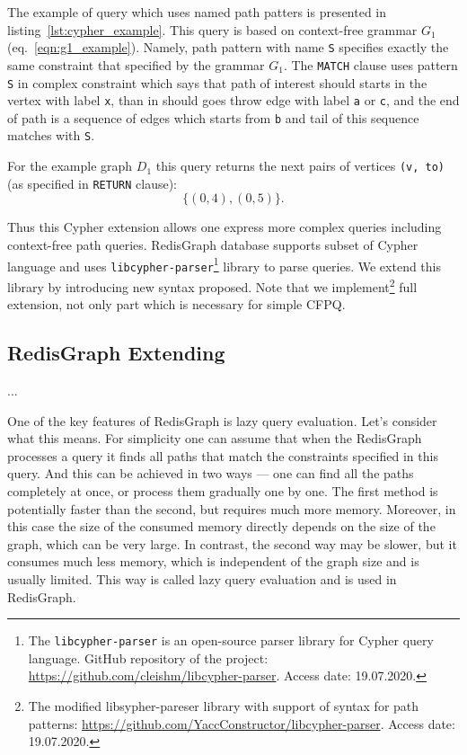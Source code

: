 The example of query which uses named path patters is presented in listing~\ref{lst:cypher_example}. 
This query is based on context-free grammar $G_1$ (eq.~\ref{eqn:g1_example}). 
Namely, path pattern with name \texttt{S} specifies exactly the same constraint that specified by the grammar $G_1$. 
The \texttt{MATCH} clause  uses pattern \texttt{S} in complex constraint which says that path of interest should starts in the vertex with label \texttt{x}, than in should goes throw edge with label \texttt{a} or \texttt{c}, and the end of path is a sequence of edges which starts from \texttt{b} and tail of this sequence matches with \texttt{S}.  

For the example graph $D_1$ this query returns the next pairs of vertices \texttt{(v, to)} (as specified in \texttt{RETURN} clause): 
$$\{(0, 4), (0, 5)\}.$$

Thus this Cypher extension allows one express more complex queries including context-free path queries.
RedisGraph database supports subset of Cypher language and uses \texttt{libcypher-parser}\footnote{The \texttt{libcypher-parser} is an open-source parser library for Cypher query language. GitHub repository of the project: \url{https://github.com/cleishm/libcypher-parser}. Access date: 19.07.2020.} library to parse queries.
We extend this library by introducing new syntax proposed.
Note that we implement\footnote{The modified libsypher-pareser library with support of syntax for path patterns: \url{https://github.com/YaccConstructor/libcypher-parser}. Access date: 19.07.2020.} full extension, not only part which is necessary for simple CFPQ. 

\subsection{RedisGraph Extending}
...

One of the key features of RedisGraph is lazy query evaluation. Let's consider what this means. For simplicity one can assume that when the RedisGraph processes a query it finds all paths that match the constraints specified in this query. And this can be achieved in two ways --- one can find all the paths completely at once, or process them gradually one by one. The first method is potentially faster than the second, but requires much more memory. Moreover, in this case the size of the consumed memory directly depends on the size of the graph, which can be very large. In contrast, the second way may be slower, but it consumes much less memory, which is independent of the graph size and is usually limited. This way is called lazy query evaluation and is used in RedisGraph.

